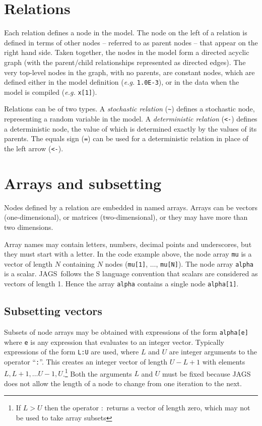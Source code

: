 \documentclass[11pt, a4paper, titlepage]{report}
\newcommand{\JAGS}{\textsf{JAGS}}
\begin{document}

\section{Relations}

Each relation defines a node in the model. The node on the left of a
relation is defined in terms of other nodes -- referred to as parent
nodes -- that appear on the right hand side. Taken together, the nodes
in the model form a directed acyclic graph (with the parent/child
relationships represented as directed edges). The very top-level
nodes in the graph, with no parents, are constant nodes, which are
defined either in the model definition ({\em e.g.}  \verb+1.0E-3+), or
in the data when the model is compiled ({\em e.g.}  \verb+x[1]+).

Relations can be of two types. A {\em stochastic relation} (\verb+~+)
defines a stochastic node, representing a random variable in the
model. A {\em deterministic relation} (\verb+<-+) defines a
deterministic node, the value of which is determined exactly by the
values of its parents. The equals sign (\verb+=+) can be used
for a deterministic relation in place of the left arrow (\verb+<-+).

\section{Arrays and subsetting}

Nodes defined by a relation are embedded in named arrays. Arrays can
be vectors (one-dimensional), or matrices (two-dimensional), or they
may have more than two dimensions.

Array names may contain letters, numbers, decimal points and
underscores, but they must start with a letter.  In the code example
above, the node array \verb+mu+ is a vector of length $N$ containing
$N$ nodes (\verb+mu[1]+, $\ldots$, \verb+mu[N]+). The node array
\verb+alpha+ is a scalar.  \JAGS\ follows the S language convention
that scalars are considered as vectors of length 1. Hence the array
\verb+alpha+ contains a single node \verb+alpha[1]+.

\subsection{Subsetting vectors}

Subsets of node arrays may be obtained with expressions of the form
\verb+alpha[e]+ where \verb+e+ is any expression that evaluates to an
integer vector. Typically expressions of the form \verb+L:U+ are used,
where $L$ and $U$ are integer arguments to the operator ``\texttt{:}''. This
creates an integer vector of length $U - L + 1$ with elements $L, L+1,
\ldots U-1, U$.\footnote{If $L > U$ then the operator $:$ returns a
  vector of length zero, which may not be used to take array subsets}
Both the arguments $L$ and $U$ must be fixed because JAGS does not
allow the length of a node to change from one iteration to the next.
\end{document}
